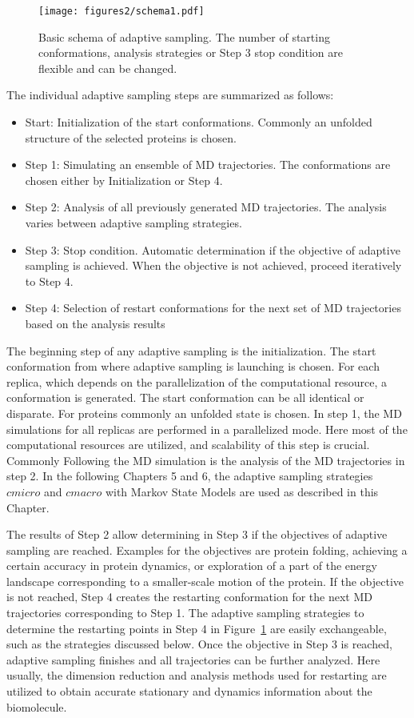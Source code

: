 \begin{figure}[h]
  \centering
  \texttt{[image: figures2/schema1.pdf]}
  \caption{Basic schema of adaptive sampling. The
  number of starting conformations, analysis strategies or Step 3 stop condition are flexible and can be changed.}
  \label{fig:schema2}
\end{figure}

The individual adaptive sampling steps are summarized as follows:
\begin{itemize}
\item Start: Initialization of the start conformations.  Commonly an unfolded structure of the selected proteins is chosen.
\item Step 1: Simulating an ensemble of MD trajectories. The conformations are chosen either by Initialization or Step 4. 
\item Step 2: Analysis of all previously generated MD trajectories. The analysis varies between adaptive sampling strategies.
\item Step 3: Stop condition. Automatic determination if the objective of adaptive sampling is achieved. When the objective is not achieved, proceed iteratively to Step 4. 
\item Step 4: Selection of restart conformations for the next set of MD trajectories based on the analysis results 
\end{itemize}

The beginning step of any adaptive sampling is the initialization. The start conformation from where adaptive sampling is launching is chosen. For each replica, which depends on the parallelization of the computational resource, a conformation is generated. The start conformation can be all identical or disparate. For proteins commonly an unfolded state is chosen.
In step 1, the MD simulations for all replicas are performed in a parallelized mode. Here most of the computational resources are utilized, and scalability of this step is crucial. Commonly  
Following the MD simulation is the analysis of the MD trajectories in step 2. In the following Chapters 5 and 6, the adaptive sampling strategies $cmicro$ and $cmacro$ with Markov State Models \cite{prinz2011markov} are used as described in this Chapter. 

The results of Step 2 allow determining in Step 3 if the objectives of adaptive sampling are reached. Examples for the objectives are protein folding, achieving a certain accuracy in protein dynamics, or exploration of a part of the energy landscape corresponding to a smaller-scale motion of the protein. If the objective is not reached, Step 4 creates the restarting conformation for the next MD trajectories corresponding to Step 1. The adaptive sampling strategies to determine the restarting points in Step 4 in Figure~\ref{fig:schema2} are easily exchangeable, such as the strategies discussed below. Once the objective in Step 3 is reached, adaptive sampling finishes and all trajectories can be further analyzed. Here usually, the dimension reduction and analysis methods used for restarting are utilized to obtain accurate stationary and dynamics information about the biomolecule.


